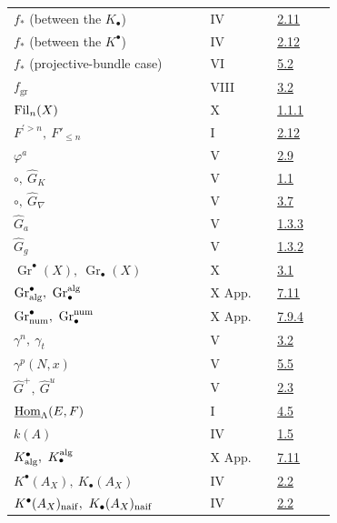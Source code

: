 \begin{longtable}{@{}>{\raggedright\arraybackslash}p{0.50\linewidth}>{\raggedright\arraybackslash}p{0.17\linewidth}>{\raggedright\arraybackslash}p{0.15\linewidth}@{}}
\(f_*\) (between the \(K_\bullet\)) & IV & \hyperlink{sga6.e04.para.2-11}{2.11}\\
\(f_*\) (between the \(K^\bullet\)) & IV & \hyperlink{sga6.e04.para.2-12}{2.12}\\
\(f_*\) (projective-bundle case) & VI & \hyperlink{sga6.e06.sec.5.2}{5.2}\\
\(f_{\operatorname{gr}}\) & VIII & \hyperlink{sga6.e08.prop.3-2}{3.2}\\
\(\operatorname{Fil}_n(X)\) & X & \hyperlink{sga6.e10.def.1-1-1}{1.1.1}\\
\(F^{\prime >n},\ F'_{\leq n}\) & I & \hyperlink{sga6.e01.prop.2-12}{2.12}\\
\(\varphi^a\) & V & \hyperlink{sga6.e05.para.2-9}{2.9}\\
\(\circ,\ \widehat G_K\) & V & \hyperlink{sga6.e05.para.1-1}{1.1}\\
\(\circ,\ \widehat G_{\nabla}\) & V & \hyperlink{sga6.e05.para.3-7}{3.7}\\
\(\widehat G_a\) & V & \hyperlink{sga6.e05.para.1-3}{1.3.3}\\
\(\widehat G_g\) & V & \hyperlink{sga6.e05.para.1-3}{1.3.2}\\
\(\operatorname{Gr}^\bullet(X),\ \operatorname{Gr}_\bullet(X)\) & X & \hyperlink{sga6.e10.sec.3.1}{3.1}\\
\(\operatorname{Gr}^\bullet_{\alg},\ \operatorname{Gr}^{\alg}_\bullet\) & X App. & \hyperlink{sga6.e10.para.7-11}{7.11}\\
\(\operatorname{Gr}^\bullet_{\num},\ \operatorname{Gr}^{\num}_\bullet\) & X App. & \hyperlink{sga6.e10.para.7-9-4}{7.9.4}\\
\(\gamma^n,\ \gamma_t\) & V & \hyperlink{sga6.e05.prop.3-2}{3.2}\\
\(\gamma^p(N,x)\) & V & \hyperlink{sga6.e05.para.5-5}{5.5}\\
\(\widehat G^+,\ \widehat G^u\) & V & \hyperlink{sga6.e05.para.2-3}{2.3}\\
\(\underline{\operatorname{Hom}}_{\Lambda}(E,F)\) & I & \hyperlink{sga6.e01.notation.4-5}{4.5}\\
\(k(A)\) & IV & \hyperlink{sga6.e04.para.1-5}{1.5}\\
\(K^\bullet_{\operatorname{alg}},\ K^{\operatorname{alg}}_\bullet\) & X App. & \hyperlink{sga6.e10.para.7-11}{7.11}\\
\(K^\bullet(A_X),\ K_\bullet(A_X)\) & IV & \hyperlink{sga6.e04.def.2-2}{2.2}\\
\(K^\bullet(A_X)_{\naif},\ K_\bullet(A_X)_{\naif}\) & IV & \hyperlink{sga6.e04.def.2-2}{2.2}\\

\end{longtable}
